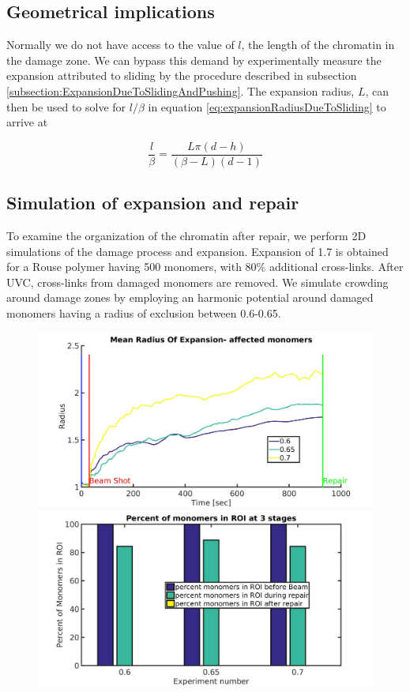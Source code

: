 \documentclass[12pt]{report}
\begin{document}
		\subsection{Geometrical implications}\label{subsection:GeometricalImplications}
		Normally we do not have access to the value of $l$, the length of the chromatin in the damage zone. 
		We can bypass this demand by experimentally measure the expansion attributed to 
		sliding by the procedure described in subsection \ref{subsection:ExpansionDueToSlidingAndPushing}. The expansion radius, $L$, can then be used to solve for $l/\beta$ in equation \ref{eq:expansionRadiusDueToSliding} to arrive at
				
		\begin{equation}\label{eq:ratioOfDNALengthToRoiRadius}
	       \frac{l}{\beta} = \frac{L\pi(d-h)}{(\beta-L)(d-1)}
		\end{equation}				
						
		\subsection{Simulation of expansion and repair}\label{subsection:SimulationOfExpansionAndRepair}
		To examine the organization of the chromatin after repair, we perform 2D simulations of the damage process and expansion. Expansion of 1.7 is obtained for a Rouse polymer having 500 monomers, with 80\% additional cross-links. 		
		After UVC, cross-links from damaged monomers are removed. We simulate crowding around damage zones by employing an harmonic potential around damaged monomers having a radius of exclusion between 0.6-0.65.
		
		
				
	\begin{figure}[H]
	\includegraphics[width=0.5\linewidth, height=0.3\textheight]{Images/Simulations/meanRadiusOfExpansionAffected}
	\includegraphics[width=0.5\linewidth, height=0.3\textheight]{Images/Simulations/percentOfMonomersInROI}
	\caption{}
	\label{fig:meanRadiusOfExpansionAffected}
	\end{figure}
\end{document}
